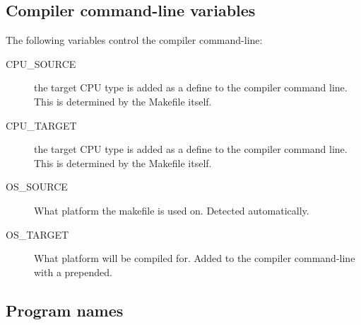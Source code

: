 {\begin{description}
\end{description}

\subsection{Compiler command-line variables}

The following variables control the compiler command-line:
\begin{description}

\item[CPU\_SOURCE] the target CPU type is added as a define to the compiler
command line. This is determined by the Makefile itself.

\item[CPU\_TARGET] the target CPU type is added as a define to the compiler
command line. This is determined by the Makefile itself.

\item[OS\_SOURCE] What platform the makefile is used on. Detected
automatically.

\item[OS\_TARGET] What platform will be compiled for. Added to the
compiler command-line with a  prepended.
\end{description}


\subsection{Program names}

}
